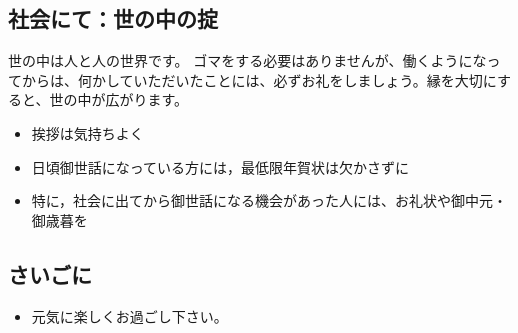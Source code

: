 \documentclass[11pt, ]{jsarticle}
\providecommand{\tightlist}{%
   \setlength{\itemsep}{0pt}\setlength{\parskip}{0pt}}
\begin{document}
\hypertarget{ux793eux4f1aux306bux3066ux4e16ux306eux4e2dux306eux639f}{%
\subsection{社会にて：世の中の掟}\label{ux793eux4f1aux306bux3066ux4e16ux306eux4e2dux306eux639f}}

世の中は人と人の世界です。
ゴマをする必要はありませんが、働くようになってからは、何かしていただいたことには、必ずお礼をしましょう。縁を大切にすると、世の中が広がります。

\begin{itemize}
\tightlist
\item
  挨拶は気持ちよく
\item
  日頃御世話になっている方には，最低限年賀状は欠かさずに
\item
  特に，社会に出てから御世話になる機会があった人には、お礼状や御中元・御歳暮を
\end{itemize}

\hypertarget{ux3055ux3044ux3054ux306b}{%
\subsection{さいごに}\label{ux3055ux3044ux3054ux306b}}

\begin{itemize}
\tightlist
\item
  元気に楽しくお過ごし下さい。
\end{itemize}
\end{document}
